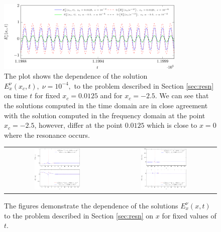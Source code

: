\begin{figure}
 \includegraphics[width=0.8\textwidth]{pics_time_domain/res/ex_fixed_x_nu1e4-crop.pdf}
 \caption{The plot shows the dependence of the solution $E_x^{\nu}(x_c,t),\;\nu=10^{-4},$ to 
 the problem described in Section \ref{sec:resn} on time $t$ for fixed 
 $x_c=0.0125$ and for $x_c=-2.5$. We can see that the solutions computed in the time domain are in close agreement 
 with the solution computed in the frequency domain at the point $x_c=-2.5$, however, differ at the point $0.0125$ which is 
 close to $x=0$ where the resonance occurs.}
 \label{fig:resonance_nus_ex_x}
\end{figure}
\begin{figure}
\begin{tabular}{cc}
\includegraphics[width=0.45\textwidth]{pics_time_domain/res/ex_fixed_t-crop.pdf}&
\includegraphics[width=0.45\textwidth]{pics_time_domain/res/ex_fixed_t_1e3-crop.pdf}
\end{tabular}
\caption{The figures demonstrate the dependence of the solutions 
$E_x^{\nu}(x,t)$ to the problem described in Section \ref{sec:resn} on $x$ for fixed values of $t$. }
\label{fig:resonance_nus_ex_t}
\end{figure}
